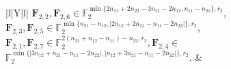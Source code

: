 \begin{longtable}{|l|Y|l|}
{%
$\boldsymbol{F}_{2,2},\boldsymbol{F}_{2,6}\in \mathbb{F}_2^{\min\{2n_{11}+2n_{22}-3n_{21}-2n_{12},n_{11}-n_{21}\},r_2}$,\\$\boldsymbol{F}_{2,3},\boldsymbol{F}_{2,5} \in \mathbb{F}_2^{\min\{n_{21}-n_{12},|2n_{12}+2n_{21}-n_{11}-2n_{22}|\},r_2}$,\\$\boldsymbol{F}_{2,1},\boldsymbol{F}_{2,7} \in \mathbb{F}_2^{2(n_{21}+n_{12}-n_{11})-n_{22},r_2}, \boldsymbol{F}_{2,4} \in$ \\ $\mathbb{F}_2^{\min\{|3n_{12}+n_{21}-n_{11}-2n_{22}|,|n_{12}+3n_{21}-n_{11}-2n_{22}|\},r_2}.$} & \\
 \hline
\end{longtable} 